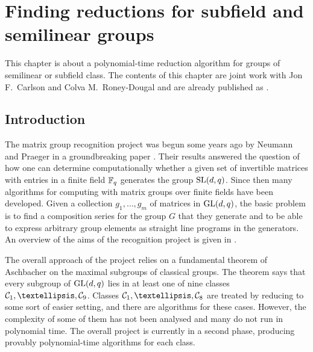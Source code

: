 
\chapter{Finding reductions for subfield and semilinear groups}
\label{chap:subsemi}

This chapter is about a polynomial-time reduction algorithm 
for groups of semilinear or subfield class.
The contents of this
chapter are joint work with Jon F.~Carlson and Colva M.~Roney-Dougal and 
are already published as \cite{subfieldpaper}.



\section{Introduction}\label{sec:intro}

The matrix group recognition project was begun some years ago 
by Neumann and Praeger in a groundbreaking paper
\cite{neumann-praeger}. Their results answered the question of how 
one can determine computationally whether a given set 
of invertible matrices with entries in a finite 
field $\mathbb{F}_q$ generates the group $\SL(d,q)$. 
Since then many algorithms for computing with matrix groups 
over finite fields have been developed. Given a collection 
$g_1, \ldots, g_m$ of  matrices in $\GL(d, q)$, the 
basic problem is to find a composition series for the 
group $G$ that they generate and to be able to express arbitrary 
group elements as straight line programs in the generators.  
%
An overview of the  aims of the recognition 
project  is given in \cite{MatGrpProj}.

The overall approach of  the project relies on a fundamental 
theorem of Aschbacher \cite{aschbacher} on the maximal
subgroups of classical groups. The theorem says that every subgroup of
$\GL(d,q)$ lies in at least one of nine classes $\CC1, \ldots, \CC9$.
Classes $\CC1, \ldots, \CC8$ are treated by reducing to 
some sort of easier setting, and there are algorithms  
for these cases. However, the
complexity of some of them has not been analysed and many
do not run in polynomial time. The overall project is currently in a 
second phase, producing provably polynomial-time algorithms for
each class. 

